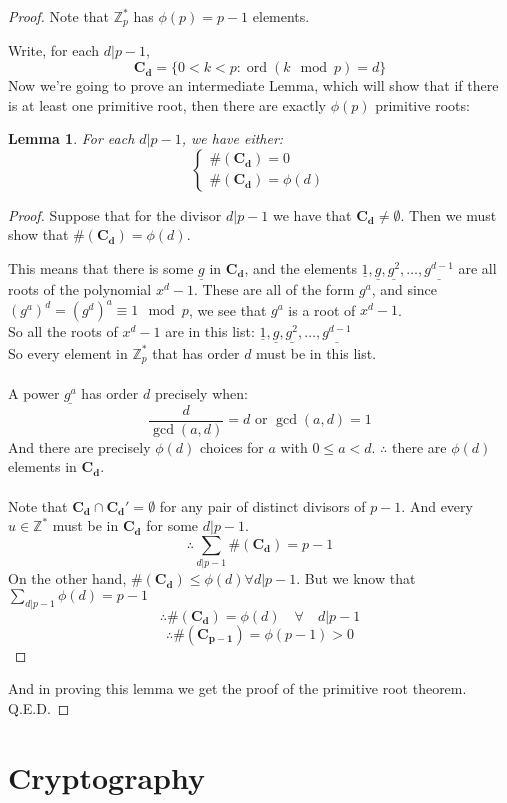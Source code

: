 \documentclass[10pt]{article}
\newcommand{\Z}{\mathbb{Z}}
\newtheorem{lemma}[theorem]{Lemma}
\theoremstyle{definition}
\theoremstyle{remark}
\def\Z{\mathbb{ Z}}
\def\ul{\underline}
\DeclareMathOperator{\ord}{ord}
\newcommand{\mb}[1]{\mathbf{#1}}
\begin{document}
\begin{proof}
Note that $\Z_{p}^*$ has $\phi(p)=p-1$ elements.

Write, for each $d|p-1$, $$ \mb{C_d} = \{0<k<p : \ord(k \mod p) = d \}$$
Now we're going to prove an intermediate Lemma, which will show that if there is at least one primitive root, then there are exactly $\phi(p)$ primitive roots:
\begin{lemma}
For each $d|p-1$, we have either:
$$\begin{cases}
\#(\mb{C_d}) = 0\\
\#(\mb{C_d}) = \phi(d)
\end{cases}$$
\end{lemma}
\begin{proof}
Suppose that for the divisor $d|p-1$ we have that $\mb{C_d} \neq \emptyset$.  Then we must show that $\#(\mb{C_d}) = \phi(d)$.

This means that there is some $\ul{g}$ in $\mb{C_d}$, and the elements $\ul{1},\ul{g},\ul{g^2},\ldots,\ul{g^{d-1}}$ are all roots of the polynomial $x^d-1$.  These are all of the form $g^a$, and since $(g^a)^d = (g^d)^a \equiv 1 \mod p$, we see that $g^a$ is a root of $x^d-1$.\\
So all the roots of $x^d-1$ are in this list: $\ul{1},\ul{g},\ul{g^2},\ldots,\ul{g^{d-1}}$\\
So every element in  $\Z_{p}^*$ that has order $d$ must be in this list.\\
\\
A power $\ul{g^a}$ has order $d$ precisely when: $$\frac{d}{\gcd(a,d)}=d \text{ or } \gcd(a,d)=1$$
And there are precisely $\phi(d)$ choices for $a$ with $0\leq a<d$.  $\therefore$ there are $\phi(d)$ elements in $\mb{C_d}$.\\
\\
Note that $\mb{C_d} \cap \mb{C_d'} = \emptyset$ for any pair of distinct divisors of $p-1$.  And every $u \in \Z^*$ must be in $\mb{C_d}$ for some $d|p-1$.
$$\therefore \sum_{d|p-1}\#(\mb{C_d})=p-1$$
On the other hand, $\#(\mb{C_d}) \leq \phi(d) \forall d|p-1$.  But we know that $\sum_{d|p-1}\phi(d)=p-1$
$$\therefore \#(\mb{C_d}) = \phi(d) \quad \forall \quad d|p-1$$
$$\therefore \#(\mb{C_{p-1}}) = \phi(p-1) > 0$$
\end{proof}
And in proving this lemma we get the proof of the primitive root theorem.  Q.E.D.
\end{proof}
\pagebreak
\section{Cryptography}
\end{document}
